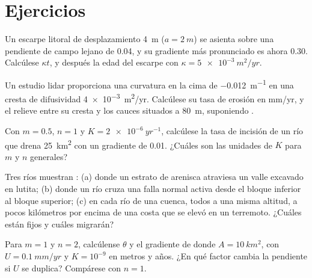 \section{Ejercicios}

\begin{exercise}[$\star$]\label{exo:b3:quantitative-geomorphology:1}
Un escarpe litoral de desplazamiento \qty{4}{m} ($a = \qty{2}{m}$) se asienta sobre
una pendiente de campo lejano de 0.04, y su gradiente más pronunciado es ahora 0.30. Calcúlese
$\kappa t$, y después la edad del escarpe con $\kappa = \qty{5e-3}{m^2/yr}$.
\end{exercise}

\begin{exercise}[$\star$]\label{exo:b3:quantitative-geomorphology:2}
Un estudio lidar proporciona una curvatura en la cima de \qty{-0.012}{m^{-1}} en una cresta
de difusividad \qty{4e-3}{m^2/yr}. Calcúlese su tasa de erosión en
\unit{mm/yr}, y el relieve entre su cresta y los cauces
situados a \qty{80}{m}, suponiendo .
\end{exercise}

\begin{exercise}[$\star$]\label{exo:b3:quantitative-geomorphology:3}
Con $m = 0.5$, $n = 1$ y $K = \qty{2e-6}{yr^{-1}}$, calcúlese la
tasa de incisión de un río que drena \qty{25}{km^2} con un gradiente de 0.01.
¿Cuáles son las unidades de $K$ para $m$ y $n$ generales?
\end{exercise}

\begin{exercise}[$\star$]\label{exo:b3:quantitative-geomorphology:4}
Tres ríos muestran : (a) donde un estrato de arenisca atraviesa un valle
excavado en lutita; (b) donde un río cruza una falla normal activa desde el
bloque inferior al bloque superior; (c) en cada río de una cuenca, todos a
una misma altitud, a pocos kilómetros por encima de una costa que se elevó en
un terremoto. ¿Cuáles están fijos y cuáles migrarán?
\end{exercise}

\begin{exercise}[$\star\star$]\label{exo:b3:quantitative-geomorphology:5}
Para $m = 1$ y $n = 2$, calcúlense $\theta$ y el gradiente de  donde $A =
\qty{10}{km^2}$, con $U = \qty{0.1}{mm/yr}$ y $K = 10^{-9}$ en metros y
años.
¿En qué factor cambia la pendiente si $U$ se duplica? Compárese con $n =
1$.
\end{exercise}

